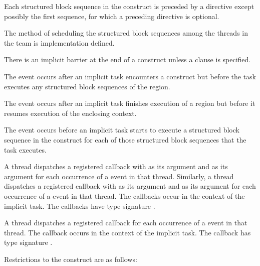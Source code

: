 \descr
Each structured block sequence in the  construct is preceded by a 
 directive except possibly the first sequence, for which a preceding 
 directive is optional.

The method of scheduling the structured block sequences among the threads in the team is
implementation defined.

There is an implicit barrier at the end of a  construct unless a 
 clause is specified.

\events

The  event occurs after an implicit task encounters a
 construct but before the task executes any 
structured block sequences of the  region.

The  event occurs after an implicit task finishes execution 
of a  region but before it resumes execution of the enclosing context.

The  event occurs before an implicit task starts
to execute a structured block sequence in the  construct for
each of those structured block sequences that the task executes.

\tools

A thread dispatches a registered  callback with 
 as its  argument and  
as its  argument for each occurrence of a  event 
in that thread. Similarly, a thread dispatches a registered 
callback with  as its  argument and 
 as its  argument for each occurrence of 
a  event in that thread. The callbacks occur in the context 
of the implicit task. The callbacks have type signature .

A thread dispatches a registered 
callback for each occurrence of a  
event in that thread. The callback occurs in the
context of the implicit task.  The callback has type signature
. 

\restrictions
Restrictions to the  construct are as follows:

